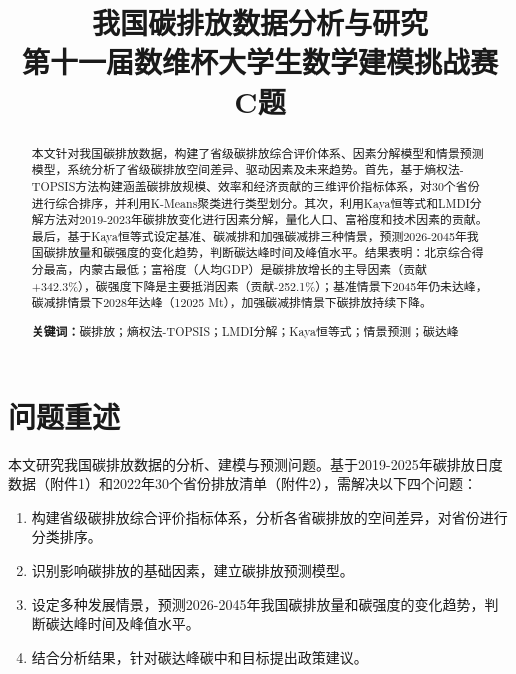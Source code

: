 \documentclass[12pt, a4paper]{article}
\title{
    \vspace{-1cm}
    {\Large \textbf{我国碳排放数据分析与研究}} \\[0.5em]
    {\large 第十一届数维杯大学生数学建模挑战赛 C题}
}
\author{}
\date{}
\begin{document}
\maketitle
\thispagestyle{empty}

\begin{abstract}
\noindent
本文针对我国碳排放数据，构建了省级碳排放综合评价体系、因素分解模型和情景预测模型，系统分析了省级碳排放空间差异、驱动因素及未来趋势。首先，基于熵权法-TOPSIS方法构建涵盖碳排放规模、效率和经济贡献的三维评价指标体系，对30个省份进行综合排序，并利用K-Means聚类进行类型划分。其次，利用Kaya恒等式和LMDI分解方法对2019-2023年碳排放变化进行因素分解，量化人口、富裕度和技术因素的贡献。最后，基于Kaya恒等式设定基准、碳减排和加强碳减排三种情景，预测2026-2045年我国碳排放量和碳强度的变化趋势，判断碳达峰时间及峰值水平。结果表明：北京综合得分最高，内蒙古最低；富裕度（人均GDP）是碳排放增长的主导因素（贡献+342.3\%），碳强度下降是主要抵消因素（贡献-252.1\%）；基准情景下2045年仍未达峰，碳减排情景下2028年达峰（12025 Mt），加强碳减排情景下碳排放持续下降。

\vspace{1em}
\noindent\textbf{关键词：}碳排放；熵权法-TOPSIS；LMDI分解；Kaya恒等式；情景预测；碳达峰
\end{abstract}

\newpage
\tableofcontents
\newpage

\section{问题重述}

本文研究我国碳排放数据的分析、建模与预测问题。基于2019-2025年碳排放日度数据（附件1）和2022年30个省份排放清单（附件2），需解决以下四个问题：

\begin{enumerate}[label=\textbf{问题\arabic*：}, leftmargin=*]
    \item 构建省级碳排放综合评价指标体系，分析各省碳排放的空间差异，对省份进行分类排序。
    \item 识别影响碳排放的基础因素，建立碳排放预测模型。
    \item 设定多种发展情景，预测2026-2045年我国碳排放量和碳强度的变化趋势，判断碳达峰时间及峰值水平。
    \item 结合分析结果，针对碳达峰碳中和目标提出政策建议。
\end{enumerate}

\end{document}
